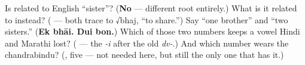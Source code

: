 \begin{tcolorbox}[breakable,colback=teal!4,colframe=teal!35!black,title={Before you move on}]
Is  related to English \textquotedblleft{}sister\textquotedblright{}? (\textbf{No} — different root entirely.) What is it related to instead? (\textbf{} — both trace to √bhaj, \textquotedblleft{}to share.\textquotedblright{}) Say \textquotedblleft{}one brother\textquotedblright{} and \textquotedblleft{}two sisters.\textquotedblright{} (\textbf{Ek bhāi. Dui bon.}) Which of those two numbers keeps a vowel Hindi and Marathi lost? (\textbf{} — the \emph{-i} after the old \emph{dv-}.) And which number wears the chandrabindu? (\textbf{}, five — not needed here, but still the only one that has it.)
\end{tcolorbox}
